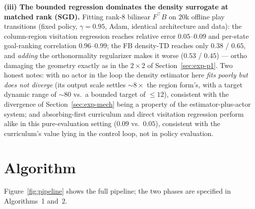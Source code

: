 \documentclass[10pt]{article}
\begin{document}
\textbf{(iii) The bounded regression dominates the density surrogate at matched rank
(SGD).} Fitting rank-$8$ bilinear $F^{\top}B$ on $20$k offline play transitions
(fixed policy, $\gamma=0.95$, Adam, identical architecture and data): the
column-region visitation regression reaches relative error $0.05$--$0.09$ and
per-state goal-ranking correlation $0.96$--$0.99$; the FB density-TD reaches only
$0.38$ / $0.65$, and \emph{adding} the orthonormality regularizer makes it worse
($0.53$ / $0.45$) --- ortho damaging the geometry exactly as in the $2\times2$ of
Section~\ref{sec:exp-p1}. Two honest notes: with no actor in the loop the density
estimator here \emph{fits poorly but does not diverge} (its output scale settles
$\sim8\times$ the region form's, with a target dynamic range of $\sim80$ vs.\ a
bounded target of $\le12$), consistent with the divergence of
Section~\ref{sec:exp-mech} being a property of the estimator-plus-actor system; and
absorbing-first curriculum and direct visitation regression perform alike in this
pure-evaluation setting ($0.09$ vs.\ $0.05$), consistent with the curriculum's value
lying in the control loop, not in policy evaluation.

\section{Algorithm}
\label{sec:algo}

Figure~\ref{fig:pipeline} shows the full pipeline; the two phases are specified in
Algorithms~1 and~2.
\end{document}
